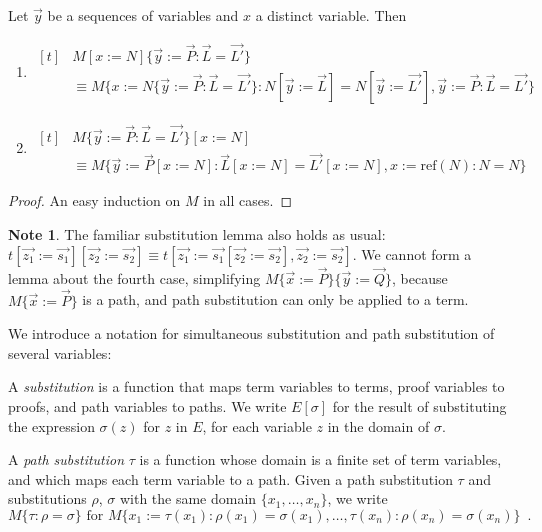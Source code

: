 \documentclass[a4paper,UKenglish]{lipics-v2016}
\newcommand*{\reff}[1]{\ensuremath{\mathrm{ref} \left( {#1} \right)}}
\theoremstyle{plain}
\theoremstyle{definition}
\newtheorem{note}[theorem]{Note}
\begin{document}
\begin{lemma}
\label{lm:subpathsub}
Let $\vec{y}$ be a sequences of variables and $x$ a distinct variable.  Then
\begin{enumerate}
\label{lm:pathsubsub}
\item
\label{lm:subpathsubi}
$ \begin{aligned}[t]
& M [ x:= N ] \{ \vec{y} := \vec{P} : \vec{L} = \vec{L'} \} \\
& \equiv M \{ x := N \{ \vec{y} := \vec{P} : \vec{L} = \vec{L'} \} : N [ \vec{y}:= \vec{L} ] = N [ \vec{y} := \vec{L'} ], \vec{y} := \vec{P} : \vec{L} = \vec{L'} \}
\end{aligned} $
\item
\label{lm:subpathsubii}
$ \begin{aligned}[t]
& M \{ \vec{y} := \vec{P} : \vec{L} = \vec{L'} \} [ x := N ] \\
& \equiv M \{ \vec{y} := \vec{P} [x := N] : \vec{L} [x := N] = \vec{L'} [x := N], x := \reff{N} : N = N \}
\end{aligned} $
\end{enumerate}
\end{lemma}

\begin{proof}
An easy induction on $M$ in all cases.
\end{proof}

\begin{note}
The familiar substitution lemma also holds as usual: $t [\vec{z_1} := \vec{s_1}] [\vec{z_2} := \vec{s_2}] \equiv t [\vec{z_1} := \vec{s_1}[\vec{z_2} := \vec{s_2}], 
\vec{z_2} := \vec{s_2}]$.  We cannot form a lemma about the fourth case, simplifying $M \{ \vec{x} := \vec{P} \} \{ \vec{y} := \vec{Q} \}$, because
$M \{ \vec{x} := \vec{P} \}$ is a path, and path substitution can only be applied to a term.
\end{note}

We introduce a notation for simultaneous substitution and path substitution of several variables:

\begin{definition}
A \emph{substitution} is a function that maps term variables to terms, proof variables to proofs, and path variables to paths.
We write $E[\sigma]$ for the result of substituting the expression $\sigma(z)$ for $z$ in $E$, for each variable $z$ in the domain of $\sigma$.

A \emph{path substitution} $\tau$ is a function whose domain is a finite set of term variables,
and which maps each term variable to a path.  Given a path substitution $\tau$ and substitutions $\rho$, $\sigma$
with the same domain $\{ x_1, \ldots, x_n \}$, we write
\[ M \{ \tau : \rho = \sigma \} \text{ for } M \{ x_1 := \tau(x_1) : \rho(x_1) = \sigma(x_1), \ldots, \tau(x_n) : \rho(x_n) = \sigma(x_n) \} \enspace . \]
\end{definition}
\end{document}
